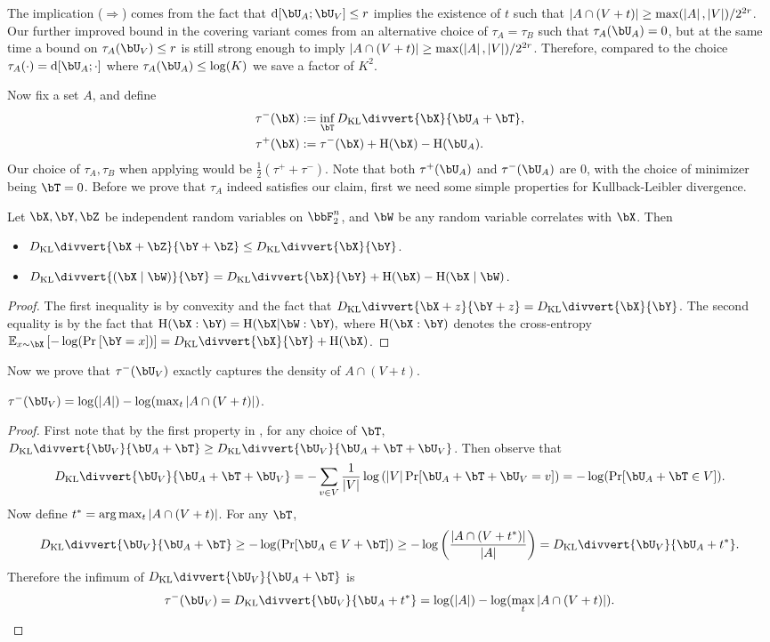 \documentclass{article}
\newcommand{\KL}{D_{\mathrm{KL}}\divvert}
\DeclarePairedDelimiter{\paren}{(}{)}
\DeclarePairedDelimiter{\sqpar}{[}{]}
\newcommand{\ent}{\mathrm{H}\paren}
\newcommand{\Ruz}{\mathrm{d}\sqpar}
\begin{document}
The implication ($\Rightarrow$) comes from the fact that $\Ruz{\bU_A;\bU_V}\le r$ implies the existence of $t$ such that $\left|A\cap (V+t)\right|\ge\max (\left|A\right|,\left|V\right|)/2^{2r}$. Our further improved bound in the covering variant comes from an alternative choice of $\tau_A=\tau_B$ such that $\tau_A(\bU_A)=0$, but at the same time a bound on $\tau_A(\bU_V)\le r$ is still strong enough to imply $\left|A\cap (V+t)\right|\ge\max (\left|A\right|,\left|V\right|)/2^{2r}$. Therefore, compared to the choice $\tau_A(\cdot)=\Ruz{\bU_A;\cdot}$ where $\tau_A(\bU_A)\le\log(K)$ we save a factor of $K^2$.

Now fix a set $A$, and define
\begin{align*}
\tau^-\paren{\bX}&:=\inf_{\bT}\KL{\bX}{\bU_A+\bT},\\
\tau^+\paren{\bX}&:=\tau^-\paren{\bX}+\ent{\bX}-\ent{\bU_A}.
\end{align*}
Our choice of $\tau_A,\tau_B$ when applying  would be $\frac{1}{2}(\tau^++\tau^-)$. Note that both $\tau^+\paren{\bU_A}$ and $\tau^-\paren{\bU_A}$ are $0$, with the choice of minimizer being $\bT=0$. Before we prove that $\tau_A$ indeed satisfies our claim, first we need some simple properties for Kullback-Leibler divergence.
\begin{lemma}\label{lemma:main-eq}
Let $\bX,\bY,\bZ$ be independent random variables on $\bbF_2^n$, and $\bW$ be any random variable correlates with $\bX$. Then
\begin{itemize}
\item 
$\KL{\bX+\bZ}{\bY+\bZ}\le \KL{\bX}{\bY}$.
\item 
$\KL{\paren{\bX\mid \bW}}{\bY}= \KL{\bX}{\bY} + \ent{\bX}-\ent{\bX\mid\bW}$.
\end{itemize}
\end{lemma}
\begin{proof}
The first inequality is by convexity and the fact that $\KL{\bX+z}{\bY+z}=\KL{\bX}{\bY}$. The second equality is by the fact that $\ent{\bX:\bY}=\ent{\bX|\bW:\bY},$
where $\ent{\bX:\bY}$ denotes the cross-entropy $\ex[x\sim\bX]{-\log(\pr{\bY=x})}=\KL{\bX}{\bY}+\ent{\bX}$.
\end{proof}
\noindent
Now we prove that $\tau^-\paren{\bU_V}$ exactly captures the density of $A\cap (V+t)$.
\begin{lemma}
$\tau^-\paren{\bU_V}=\log(|A|)-\log(\max_t\abs{A\cap (V+t)})$.
\end{lemma}
\begin{proof}
First note that by the first property in , for any choice of $\bT$, $\KL{\bU_V}{\bU_A+\bT}\ge\KL{\bU_V}{\bU_A+\bT+\bU_V}$. Then observe that $$\KL{\bU_V}{\bU_A+\bT+\bU_V}=-\sum_{v\in V}\frac{1}{\abs{V}}\log\left(\abs{V}\Pr[\bU_A+\bT+\bU_V=v]\right)=-\log(\Pr[\bU_A+\bT\in V]).$$ Now define $t^*=\arg\max_{t}\left|A\cap (V+t)\right|$. For any $\bT$, $$\KL{\bU_V}{\bU_A+\bT}\ge-\log(\Pr[\bU_A\in V+\bT])\ge -\log\left(\frac{\abs{A\cap(V+t^*)}}{\abs{A}}\right)=\KL{\bU_V}{\bU_A+t^*}.$$ Therefore the infimum of $\KL{\bU_V}{\bU_A+\bT}$ is $$\tau^-(\bU_V)=\KL{\bU_V}{\bU_A+t^*}=\log(|A|)-\log(\max_t\abs{A\cap (V+t)}).$$
\end{proof}
\end{document}
